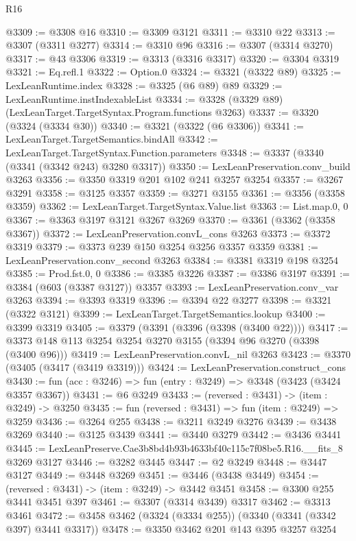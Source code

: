 \begin{lexlean}{R16}
\begin{coremodule}
@3309 := @3308 @16
@3310 := @3309 @3121
@3311 := @3310 @22
@3313 := @3307 (@3311 @3277)
@3314 := @3310 @96
@3316 := @3307 (@3314 @3270)
@3317 := @43 @3306
@3319 := @3313 (@3316 @3317)
@3320 := @3304 @3319
@3321 := Eq.refl.{1}
@3322 := Option.{0}
@3324 := @3321 (@3322 @89)
@3325 := LexLeanRuntime.index
@3328 := @3325 (@6 @89) @89
@3329 := LexLeanRuntime.instIndexableList
@3334 := @3328 (@3329 @89) (LexLeanTarget.TargetSyntax.Program.functions @3263)
@3337 := @3320 (@3324 (@3334 @30))
@3340 := @3321 (@3322 (@6 @3306))
@3341 := LexLeanTarget.TargetSemantics.bindAll
@3342 := LexLeanTarget.TargetSyntax.Function.parameters
@3348 := @3337 (@3340 (@3341 (@3342 @243) @3280 @3317))
@3350 := LexLeanPreservation.conv_build @3263
@3356 := @3350 @3319 @201 @102 @241 @3257 @3254
@3357 := @3267 @3291
@3358 := @3125 @3357
@3359 := @3271 @3155
@3361 := @3356 (@3358 @3359)
@3362 := LexLeanTarget.TargetSyntax.Value.list
@3363 := List.map.{0, 0}
@3367 := @3363 @3197 @3121 @3267 @3269
@3370 := @3361 (@3362 (@3358 @3367))
@3372 := LexLeanPreservation.convL_cons @3263
@3373 := @3372 @3319
@3379 := @3373 @239 @150 @3254 @3256 @3357 @3359
@3381 := LexLeanPreservation.conv_second @3263
@3384 := @3381 @3319 @198 @3254
@3385 := Prod.fst.{0, 0}
@3386 := @3385 @3226
@3387 := @3386 @3197
@3391 := @3384 (@603 (@3387 @3127)) @3357
@3393 := LexLeanPreservation.conv_var @3263
@3394 := @3393 @3319
@3396 := @3394 @22 @3277
@3398 := @3321 (@3322 @3121)
@3399 := LexLeanTarget.TargetSemantics.lookup
@3400 := @3399 @3319
@3405 := @3379 (@3391 (@3396 (@3398 (@3400 @22))))
@3417 := @3373 @148 @113 @3254 @3254 @3270 @3155 (@3394 @96 @3270 (@3398 (@3400 @96)))
@3419 := LexLeanPreservation.convL_nil @3263
@3423 := @3370 (@3405 (@3417 (@3419 @3319)))
@3424 := LexLeanPreservation.construct_cons
@3430 := fun (acc : @3246) => fun (entry : @3249) => @3348 (@3423 (@3424 @3357 @3367))
@3431 := @6 @3249
@3433 := (reversed : @3431) -> (item : @3249) -> @3250
@3435 := fun (reversed : @3431) => fun (item : @3249) => @3259
@3436 := @3264 @255
@3438 := @3211 @3249 @3276
@3439 := @3438 @3269
@3440 := @3125 @3439
@3441 := @3440 @3279
@3442 := @3436 @3441
@3445 := LexLeanPreserve.Cae3b8bd4b93b4633bf40c115c7f08be5.R16.__fits_8 @3269 @3127
@3446 := @3282 @3445
@3447 := @2 @3249
@3448 := @3447 @3127
@3449 := @3448 @3269
@3451 := @3446 (@3438 @3449)
@3454 := (reversed : @3431) -> (item : @3249) -> @3442 @3451
@3458 := @3300 @255 @3441 @3451 @397
@3461 := @3307 (@3314 @3439) @3317
@3462 := @3313 @3461
@3472 := @3458 @3462 (@3324 (@3334 @255)) (@3340 (@3341 (@3342 @397) @3441 @3317))
@3478 := @3350 @3462 @201 @143 @395 @3257 @3254

\end{coremodule}
\end{lexlean}
